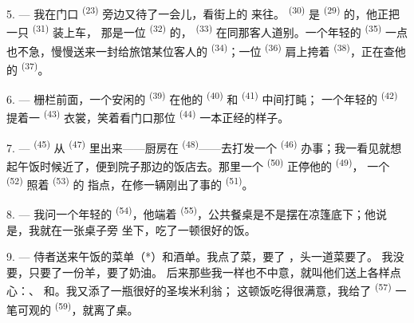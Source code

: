 5. --- 我在门口 \textsuperscript{(23)} 旁边又待了一会儿，看街上的
来往。 \textsuperscript{(30)} 是
\textsuperscript{(29)} 的，他正把一只 \textsuperscript{(31)} 装上车，
那是一位 \textsuperscript{(32)} 的， \textsuperscript{(33)} 在同那客人道别。一个年轻的
 \textsuperscript{(35)} 一点也不急，慢慢送来一封给旅馆某位客人的
 \textsuperscript{(34)}；一位 \textsuperscript{(36)} 肩上挎着
 \textsuperscript{(38)}，正在查他的 \textsuperscript{(37)}。

\VUsaut{4.0mm}
\VUsaut{3.0mm}

6. --- 栅栏前面，一个安闲的 \textsuperscript{(39)} 在他的
 \textsuperscript{(40)} 和 \textsuperscript{(41)} 中间打盹；
一个年轻的 \textsuperscript{(42)} 提着一 \textsuperscript{(43)}
衣裳，笑着看门口那位 \textsuperscript{(44)} 一本正经的样子。

7. ---  \textsuperscript{(45)} 从 \textsuperscript{(47)}
里出来——厨房在 \textsuperscript{(48)}——去打发一个
 \textsuperscript{(46)} 办事；我一看见就想起午饭时候近了，便到院子那边的饭店去。那里一个
 \textsuperscript{(50)} 正停他的 \textsuperscript{(49)}，
一个 \textsuperscript{(52)} 照着 \textsuperscript{(53)} 的
指点，在修一辆刚出了事的 \textsuperscript{(51)}。

8. --- 我问一个年轻的 \textsuperscript{(54)}，他端着
 \textsuperscript{(55)}，公共餐桌是不是摆在凉篷底下；他说是，我就在一张桌子旁
坐下，吃了一顿很好的饭。


\VUsaut{4.0mm}
\VUsaut{3.0mm}

9. --- 侍者送来午饭的菜单（*）和酒单。我点了菜，要了
，头一道菜要了。
我没要，只要了一份羊，要了奶油。
后来那些我一样也不中意，就叫他们送上各样点心：、
和。我又添了一瓶很好的圣埃米利翁；
这顿饭吃得很满意，我给了 \textsuperscript{(57)} 一笔可观的
 \textsuperscript{(59)}，就离了桌。

